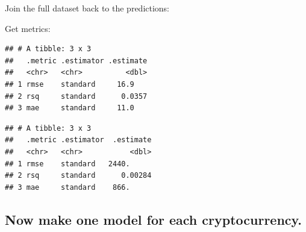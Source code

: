 \documentclass[
]{book}
\newenvironment{Shaded}{\begin{snugshade}}{\end{snugshade}}
\newcommand{\DataTypeTok}[1]{\textcolor[rgb]{0.13,0.29,0.53}{#1}}
\newcommand{\KeywordTok}[1]{\textcolor[rgb]{0.13,0.29,0.53}{\textbf{#1}}}
\newcommand{\NormalTok}[1]{#1}
\newcommand{\OperatorTok}[1]{\textcolor[rgb]{0.81,0.36,0.00}{\textbf{#1}}}
\newcommand{\StringTok}[1]{\textcolor[rgb]{0.31,0.60,0.02}{#1}}
\begin{document}
Join the full dataset back to the predictions:

\begin{Shaded}
\end{Shaded}

Get metrics:

\begin{Shaded}
\end{Shaded}

\begin{verbatim}
## # A tibble: 3 x 3
##   .metric .estimator .estimate
##   <chr>   <chr>          <dbl>
## 1 rmse    standard     16.9   
## 2 rsq     standard      0.0357
## 3 mae     standard     11.0
\end{verbatim}

\begin{Shaded}
\end{Shaded}

\begin{verbatim}
## # A tibble: 3 x 3
##   .metric .estimator  .estimate
##   <chr>   <chr>           <dbl>
## 1 rmse    standard   2440.     
## 2 rsq     standard      0.00284
## 3 mae     standard    866.
\end{verbatim}

\hypertarget{now-make-one-model-for-each-cryptocurrency.}{%
\subsection{Now make one model for each cryptocurrency.}\label{now-make-one-model-for-each-cryptocurrency.}}
\end{document}

